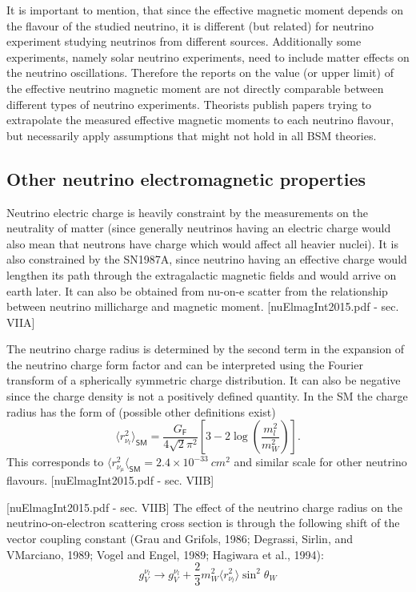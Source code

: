 It is important to mention, that since the effective magnetic moment depends on the flavour of the studied neutrino, it is different (but related) for neutrino experiment studying neutrinos from different sources. Additionally some experiments, namely solar neutrino experiments, need to include matter effects on the neutrino oscillations. Therefore the reports on the value (or upper limit) of the effective neutrino magnetic moment are not directly comparable between different types of neutrino experiments. Theorists publish papers trying to extrapolate the measured effective magnetic moments to each neutrino flavour, but necessarily apply assumptions that might not hold in all BSM theories.

\subsection{Other neutrino electromagnetic properties}\label{sec:otherNuElmagProperties}

Neutrino electric charge is heavily constraint by the measurements on the neutrality of matter (since generally neutrinos having an electric charge would also mean that neutrons have charge which would affect all heavier nuclei). It is also constrained by the SN1987A, since neutrino having an effective charge would lengthen its path through the extragalactic magnetic fields and would arrive on earth later. It can also be obtained from nu-on-e scatter from the relationship between neutrino millicharge and magnetic moment. [nuElmagInt2015.pdf - sec. VIIA]

The neutrino charge radius is determined by the second term in the expansion of the neutrino charge form factor and can be interpreted using the Fourier transform of a spherically symmetric charge distribution. It can also be negative since the charge density is not a positively defined quantity. In the SM the charge radius has the form of (possible other definitions exist)
\begin{equation}
\langle r_{\nu_l}^2\rangle_{\textsf{SM}}=\frac{G_{\textsf{F}}}{4\sqrt{2}\pi^2}\left[3-2\log\left(\frac{m_l^2}{m_W^2}\right)\right].
\end{equation}
This corresponds to $\langle r_{\nu_{\mu}}^2\langle_{\textsf{SM}}=2.4\times 10^{-33}\ \unit{cm^2}$ and similar scale for other neutrino flavours. [nuElmagInt2015.pdf - sec. VIIB]

[nuElmagInt2015.pdf - sec. VIIB]
The effect of the neutrino charge radius on the neutrino-on-electron scattering cross section is through the following shift of the vector coupling constant (Grau and Grifols, 1986; Degrassi, Sirlin, and VMarciano, 1989; Vogel and Engel, 1989; Hagiwara et al., 1994):
\begin{equation}
g_V^{\nu_l}\rightarrow g_V^{\nu_l}+\frac{2}{3}m_W^2\langle r_{\nu_l}^2\rangle\sin^2\theta_W
\end{equation}

